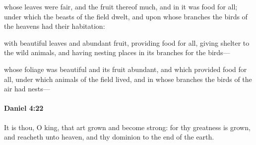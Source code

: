 			\begin{versebox}
					\item[BHS] 
					\item[LXX] 
					\item[ASV] whose leaves were fair, and the fruit thereof much, and in it was food for all; under which the beasts of the field dwelt, and upon whose branches the birds of the heavens had their habitation:
					\item[NIV] with beautiful leaves and abundant fruit, providing food for all, giving shelter to the wild animals, and having nesting places in its branches for the birds—
					\item[NRSV] whose foliage was beautiful and its fruit abundant, and which provided food for all, under which animals of the field lived, and in whose branches the birds of the air had nests—
			\end{versebox}

		\paragraph{Daniel 4:22} %
			\label{DANIEL-4-22}

			It is thou, O king, that art grown and become strong: for thy greatness is grown, and reacheth unto heaven, and thy dominion to the end of the earth.

